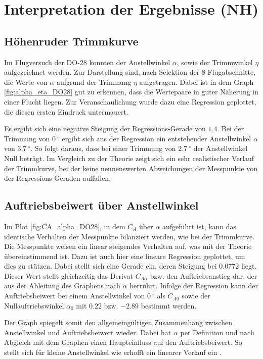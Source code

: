 \chapter{Interpretation der Ergebnisse (NH)}

\section{Höhenruder Trimmkurve}

Im Flugversuch der DO-28 konnten der Anstellwinkel $\alpha$, sowie der Trimmwinkel $\eta$ aufgezeichnet werden. Zur Darstellung sind, nach Selektion der 8 Flugabschnitte, die Werte von $\alpha$ aufgrund der Trimmung $\eta$ aufgetragen. Dabei ist in dem Graph \ref{fig:alpha_eta_DO28} gut zu erkennen, dass die Wertepaare in guter Näherung in einer Flucht liegen. Zur Veranschaulichung wurde dazu eine Regression geplottet, die diesen ersten Eindruck untermauert.  

Es ergibt sich eine negative Steigung der Regressions-Gerade von $1.4$. Bei der Trimmung von $0 \ ^{\circ}$ ergibt sich aus der Regression ein entstehender Anstellwinkel $\alpha$ von $3.7 \ ^{\circ}$. So folgt daraus, dass bei einer Trimmung von $2.7 \ ^{\circ}$ der Anstellwinkel Null beträgt. Im Vergleich zu der Theorie zeigt sich ein sehr realistischer Verlauf der Trimmkurve, bei der keine nennenswerten Abweichungen der Messpunkte von der Regressions-Geraden auffallen.

\section{Auftriebsbeiwert über Anstellwinkel}

Im Plot \ref{fig:CA_alpha_DO28}, in dem $C_A$ über $\alpha$ aufgeführt ist, kann das identische Verhalten der Messpunkte bilanziert werden, wie bei der Trimmkurve. Die Messpunkte weisen ein linear steigendes Verhalten auf, was mit der Theorie übereinstimmend ist. Dazu ist auch hier eine lineare Regression geplottet, um dies zu stützen. Dabei stellt sich eine Gerade ein, deren Steigung bei $0.0772$ liegt. Dieser Wert stellt gleichzeitig das Derivat $C_{A\alpha}$ bzw. den Auftriebsanstieg dar, der aus der Ableitung des Graphens nach $\alpha$ herrührt. Infolge der Regression kann der Auftriebsbeiwert bei einem Anstellwinkel von $0 \ ^{\circ}$ als $C_{A0}$ sowie der Nullauftriebswinkel $\alpha_0$ mit $0.22$ bzw. $-2.89$ bestimmt werden.

Der Graph spiegelt somit den allgemeingültigen Zusammenhang zwischen Anstellwinkel und Auftriebsbeiwert wieder. Dabei hat $\alpha$ per Definition und nach Abgleich mit dem Graphen einen Haupteinfluss auf den Auftriebsbeiwert. So stellt sich für kleine Anstellwinkel wie erhofft ein linearer Verlauf ein \cite{Skript}.

